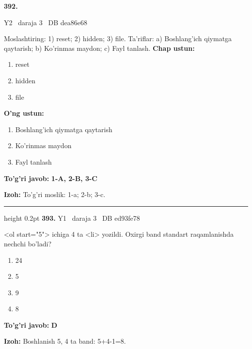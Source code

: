 \documentclass[10pt,a4paper,oneside]{article}
\begin{document}
\hypertarget{q392}{\textbf{\color{ink}392.}}  {\color{muted}\scriptsize Y2 \textbullet\ daraja 3 \textbullet\ DB dea86e68}
\par
Moslashtiring: 1) reset; 2) hidden; 3) file. Ta'riflar: a) Boshlang'ich qiymatga qaytarish; b) Ko'rinmas maydon; c) Fayl tanlash.
\textbf{\footnotesize Chap ustun:}
\begin{enumerate}[label=\arabic*),leftmargin=9mm]
\item reset
\item hidden
\item file
\end{enumerate}
\textbf{\footnotesize O'ng ustun:}
\begin{enumerate}[label=\Alph*),leftmargin=9mm]
\item Boshlang'ich qiymatga qaytarish
\item Ko'rinmas maydon
\item Fayl tanlash
\end{enumerate}
\begin{tcolorbox}[enhanced,breakable,colback=teal!4,colframe=teal!45!black,boxrule=0.45pt,arc=1.2mm,left=2.8mm,right=2.8mm,top=2mm,bottom=2mm,before skip=2mm,after skip=2mm]
\textbf{\color{teal}To'g'ri javob:} \textbf{1-A, 2-B, 3-C}
\par\smallskip
\textbf{Izoh:} To'g'ri moslik: 1-a; 2-b; 3-c.
\end{tcolorbox}
\vspace{2mm}\hrule height 0.2pt \vspace{4mm}
\hypertarget{q393}{\textbf{\color{ink}393.}}  {\color{muted}\scriptsize Y1 \textbullet\ daraja 3 \textbullet\ DB ed93fe78}
\par
\textless{}ol start="5"\textgreater{} ichiga 4 ta \textless{}li\textgreater{} yozildi. Oxirgi band standart raqamlanishda nechchi bo'ladi?
\begin{enumerate}[label=\Alph*),leftmargin=9mm]
\item 24
\item 5
\item 9
\item 8
\end{enumerate}
\begin{tcolorbox}[enhanced,breakable,colback=teal!4,colframe=teal!45!black,boxrule=0.45pt,arc=1.2mm,left=2.8mm,right=2.8mm,top=2mm,bottom=2mm,before skip=2mm,after skip=2mm]
\textbf{\color{teal}To'g'ri javob:} \textbf{D}
\par\smallskip
\textbf{Izoh:} Boshlanish 5, 4 ta band: 5+4-1=8.
\end{tcolorbox}
\end{document}
